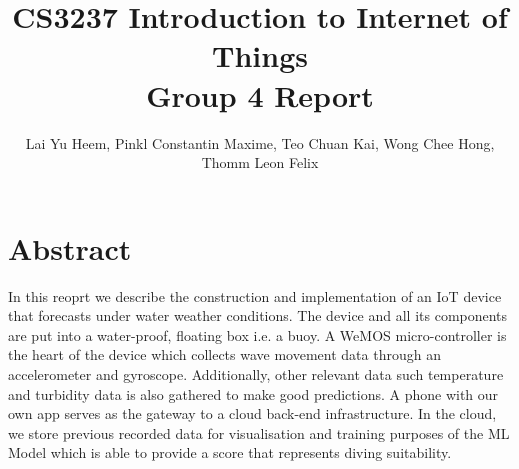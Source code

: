 \documentclass{article}
\begin{document}

\title{CS3237 Introduction to Internet of Things \\ Group 4 Report}
\author{Lai Yu Heem, Pinkl Constantin Maxime, Teo Chuan Kai, Wong Chee Hong, Thomm Leon Felix}
\maketitle

\renewcommand\thesection{\arabic{section}}
\renewcommand\thesubsection{\thesection.\alph{subsection}}

\newcommand\ISquaredC{$\text{I}^2\text{C}$}

\section{Abstract}

In this reoprt we describe the construction and implementation of an IoT device that forecasts under water weather conditions. The device and all its components are put into a water-proof, floating box i.e. a buoy. A WeMOS micro-controller is the heart of the device which collects wave movement data through an accelerometer and gyroscope. Additionally, other relevant data such temperature and turbidity data is also gathered to make good predictions. A phone with our own app serves as the gateway to a cloud back-end infrastructure. In the cloud, we store previous recorded data for visualisation and training purposes of the ML Model which is able to provide a score that represents diving suitability.
\end{document}
